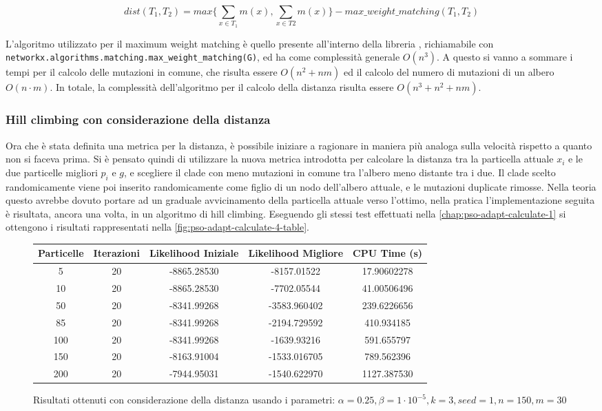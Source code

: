 \begin{equation}
  \label{eq:pso-adapt-calculate-2-algo-1}
  dist(T_1, T_2) = max \{ \sum_{x \in T_1} m(x), \sum_{x \in T2} m(x) \} - max\_weight\_matching(T_1, T_2)
\end{equation}

L'algoritmo utilizzato per il maximum weight matching è quello presente all'interno della libreria , 
richiamabile con \texttt{networkx.algorithms.matching.max\_weight\_matching(G)}, ed ha come complessità generale $O(n^3)$. A questo si vanno a sommare i tempi per il calcolo delle mutazioni in comune, che risulta essere $O(n^2 + nm)$ ed il calcolo del numero di mutazioni di un albero $O(n \cdot m)$. In totale, la complessità dell'algoritmo per il calcolo della distanza risulta essere $O(n^3 + n^2 + nm)$.

\subsubsection{Hill climbing con considerazione della distanza}
\label{chap:pso-adapt-calculate-4}
Ora che è stata definita una metrica per la distanza, è possibile iniziare a ragionare in maniera più analoga sulla velocità rispetto a quanto non si faceva prima. Si è pensato quindi di utilizzare la nuova metrica introdotta per calcolare la distanza tra la particella attuale $x_i$ e le due particelle migliori $p_i$ e $g$, e scegliere il clade con meno mutazioni in comune tra l'albero meno distante tra i due. Il clade scelto randomicamente viene poi inserito randomicamente come figlio di un nodo dell'albero attuale, e le mutazioni duplicate rimosse. Nella teoria questo avrebbe dovuto portare ad un graduale avvicinamento della particella attuale verso l'ottimo, nella pratica l'implementazione seguita è risultata, ancora una volta, in un algoritmo di hill climbing.
Eseguendo gli stessi test effettuati nella \autoref{chap:pso-adapt-calculate-1} si ottengono i risultati rappresentati nella \autoref{fig:pso-adapt-calculate-4-table}. 

\begin{figure}[!h]
  \centering
  \begin{tabular}{*{5}{c}}
    Particelle & Iterazioni & Likelihood Iniziale & Likelihood Migliore & CPU Time (s) \\ \midrule \midrule
    5 & 20 & -8865.28530 & -8157.01522 & 17.90602278 \\
    10 & 20 & -8865.28530 & -7702.05544 & 41.00506496 \\
    50 & 20 & -8341.99268 & -3583.960402 & 239.6226656 \\
    85 & 20 & -8341.99268 & -2194.729592 & 410.934185 \\
    100 & 20 & -8341.99268 & -1639.93216 & 591.655797 \\
    150 & 20 & -8163.91004 & -1533.016705 & 789.562396 \\
    200 & 20 & -7944.95031 & -1540.622970 & 1127.387530
  \end{tabular}
  \caption{Risultati ottenuti con considerazione della distanza usando i parametri: $\alpha = 0.25, \beta = 1\cdot 10^{-5}, k = 3, seed = 1, n = 150, m = 30$}
  \label{fig:pso-adapt-calculate-4-table}
\end{figure}

